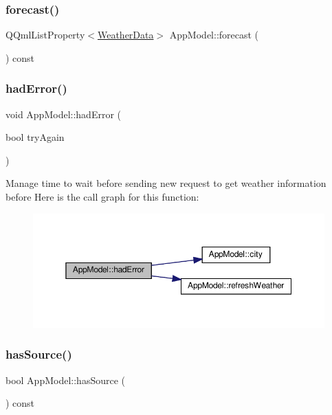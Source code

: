 \subsubsection{\texorpdfstring{forecast()}{forecast()}}
{\footnotesize\ttfamily Q\+Qml\+List\+Property$<$\hyperlink{class_weather_data}{Weather\+Data}$>$ App\+Model\+::forecast (\begin{DoxyParamCaption}{ }\end{DoxyParamCaption}) const}

\mbox{\label{class_app_model_ac5fe590924b727724d9c686bb2552ed8}} 
\subsubsection{\texorpdfstring{had\+Error()}{hadError()}}
{\footnotesize\ttfamily void App\+Model\+::had\+Error (\begin{DoxyParamCaption}\item[{bool}]{try\+Again }\end{DoxyParamCaption})}

Manage time to wait before sending new request to get weather information before Here is the call graph for this function\+:
\nopagebreak
\begin{figure}[H]
\begin{center}
\leavevmode
\includegraphics[width=350pt]{class_app_model_ac5fe590924b727724d9c686bb2552ed8_cgraph}
\end{center}
\end{figure}
\mbox{\label{class_app_model_a8ad68e982b0a307d9986ff538baedbd2}} 
\subsubsection{\texorpdfstring{has\+Source()}{hasSource()}}
{\footnotesize\ttfamily bool App\+Model\+::has\+Source (\begin{DoxyParamCaption}{ }\end{DoxyParamCaption}) const}

